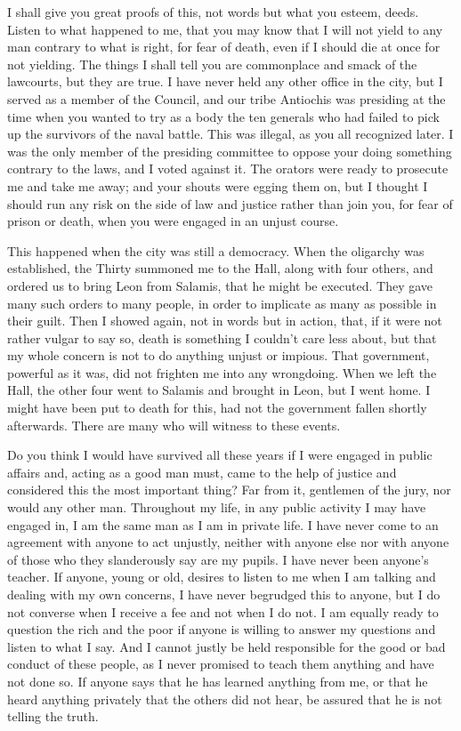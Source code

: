 I shall give you great proofs of this, not words but what you esteem, deeds. Listen to what
happened to me, that you may know that I will not yield to any man contrary to what is right, for
fear of death, even if I should die at once for not yielding. The things I shall tell you are
commonplace and smack of the lawcourts, but they are true. I have never held any other office in
the city, but I served as a member of the Council, and our tribe Antiochis was presiding at the time
when you wanted to try as a body the ten generals who had failed to pick up the survivors of the
naval battle. This was illegal, as you all recognized later. I was the only member of the presiding
committee to oppose your doing something contrary to the laws, and I voted against it. The orators
were ready to prosecute me and take me away; and your shouts were egging them on, but I thought
I should run any risk on the side of law and justice rather than join you, for fear of prison or death,
when you were engaged in an unjust course.

This happened when the city was still a democracy. When the oligarchy was established, the
Thirty summoned me to the Hall, along with four others, and ordered us to bring Leon from
Salamis, that he might be executed. They gave many such orders to many people, in order to
implicate as many as possible in their guilt. Then I showed again, not in words but in action, that,
if it were not rather vulgar to say so, death is something I couldn't care less about, but that my
whole concern is not to do anything unjust or impious. That government, powerful as it was, did
not frighten me into any wrongdoing. When we left the Hall, the other four went to Salamis and
brought in Leon, but I went home. I might have been put to death for this, had not the government
fallen shortly afterwards. There are many who will witness to these events.

Do you think I would have survived all these years if I were engaged in public affairs and,
acting as a good man must, came to the help of justice and considered this the most important
thing? Far from it, gentlemen of the jury, nor would any other man. Throughout my life, in any
public activity I may have engaged in, I am the same man as I am in private life. I have never come
to an agreement with anyone to act unjustly, neither with anyone else nor with anyone of those
who they slanderously say are my pupils. I have never been anyone's teacher. If anyone, young or
old, desires to listen to me when I am talking and dealing with my own concerns, I have never
begrudged this to anyone, but I do not converse when I receive a fee and not when I do not. I am
equally ready to question the rich and the poor if anyone is willing to answer my questions and
listen to what I say. And I cannot justly be held responsible for the good or bad conduct of these
people, as I never promised to teach them anything and have not done so. If anyone says that he
has learned anything from me, or that he heard anything privately that the others did not hear, be
assured that he is not telling the truth.

